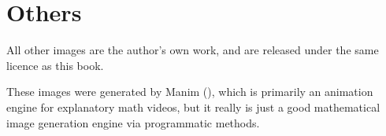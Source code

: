 \section*{Others}
All other images are the author's own work, and are released under the same licence as this book. 

These images were generated by Manim (\cite{manim}), which is primarily an animation engine for explanatory math videos, but it really is just a good mathematical image generation engine via programmatic methods.
